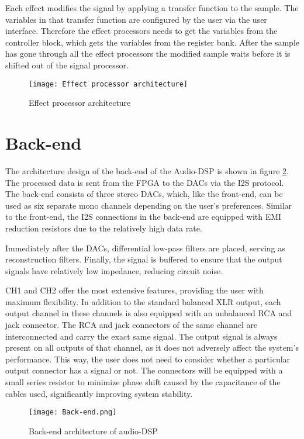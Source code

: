 Each effect modifies the signal by applying a transfer function to the sample. The variables in that transfer function are configured by the user via the user interface. Therefore the effect processors needs to get the variables from the controller block, which gets the variables from the register bank. After the sample has gone through all the effect processors the modified sample waits before it is shifted out of the signal processor. 

\begin{figure}[ht]
    \texttt{[image: Effect processor architecture]}
    \caption{Effect processor architecture}
    \label{fig:arch-effect-processor}
\end{figure}

\section{Back-end}
The architecture design of the back-end of the Audio-DSP is shown in figure \ref{fig:arch-back-end}. The processed data is sent from the FPGA to the DACs via the I2S protocol. The back-end consists of three stereo DACs, which, like the front-end, can be used as six separate mono channels depending on the user's preferences. Similar to the front-end, the I2S connections in the back-end are equipped with EMI reduction resistors due to the relatively high data rate.

Immediately after the DACs, differential low-pass filters are placed, serving as reconstruction filters. Finally, the signal is buffered to ensure that the output signals have relatively low impedance, reducing circuit noise.

CH1 and CH2 offer the most extensive features, providing the user with maximum flexibility. In addition to the standard balanced XLR output, each output channel in these channels is also equipped with an unbalanced RCA and jack connector. The RCA and jack connectors of the same channel are interconnected and carry the exact same signal. The output signal is always present on all outputs of that channel, as it does not adversely affect the system's performance. This way, the user does not need to consider whether a particular output connector has a signal or not. The connectors will be equipped with a small series resistor to minimize phase shift caused by the capacitance of the cables used, significantly improving system stability.

\begin{figure}[ht]
    \texttt{[image: Back-end.png]}\\    
    \caption{Back-end architecture of audio-DSP}
    \label{fig:arch-back-end}
\end{figure}

